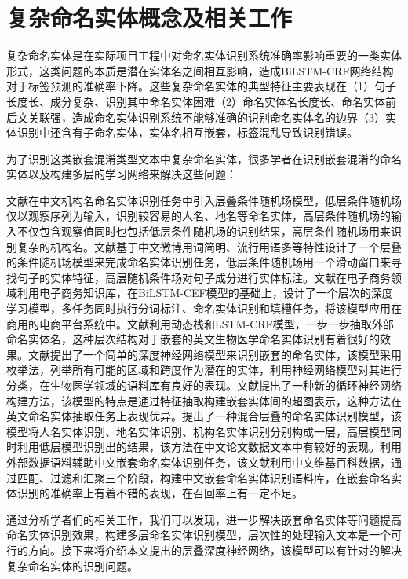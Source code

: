 \documentclass[winfonts,master,oneside,nobackinfo]{njuthesis}
\begin{document}
\section{复杂命名实体概念及相关工作}

复杂命名实体是在实际项目工程中对命名实体识别系统准确率影响重要的一类实体形式，这类问题的本质是潜在实体名之间相互影响，造成BiLSTM-CRF网络结构对于标签预测的准确率下降。这些复杂命名实体的典型特征主要表现在（1）句子长度长、成分复杂、识别其中命名实体困难（2）命名实体名长度长、命名实体前后文关联强，造成命名实体识别系统不能够准确的识别命名实体名的边界（3）实体识别中还含有子命名实体，实体名相互嵌套，标签混乱导致识别错误。

为了识别这类嵌套混淆类型文本中复杂命名实体，很多学者在识别嵌套混淆的命名实体以及构建多层的学习网络来解决这些问题：

文献\cite{junsheng}在中文机构名命名实体识别任务中引入层叠条件随机场模型，低层条件随机场仅以观察序列为输入，识别较容易的人名、地名等命名实体，高层条件随机场的输入不仅包含观察值同时也包括低层条件随机场的识别结果，高层条件随机场用来识别复杂的机构名。文献\cite{Yixue}基于中文微博用词简明、流行用语多等特性设计了一个层叠的条件随机场模型来完成命名实体识别任务，低层条件随机场用一个滑动窗口来寻找句子的实体特征，高层随机条件场对句子成分进行实体标注。文献\cite{taobao}在电子商务领域利用电子商务知识库，在BiLSTM-CEF模型的基础上，设计了一个层次的深度学习模型，多任务同时执行分词标注、命名实体识别和填槽任务，将该模型应用在商用的电商平台系统中。文献\cite{Meizhi}利用动态栈和LSTM-CRF模型，一步一步抽取外部命名实体名，这种层次结构对于嵌套的英文生物医学命名实体识别有着很好的效果。文献\cite{Mohammad}提出了一个简单的深度神经网络模型来识别嵌套的命名实体，该模型采用枚举法，列举所有可能的区域和跨度作为潜在的实体，利用神经网络模型对其进行分类，在生物医学领域的语料库有良好的表现。文献\cite{Arzoo}提出了一种新的循环神经网络构建方法，该模型的特点是通过特征抽取构建嵌套实体间的超图表示，这种方法在英文命名实体抽取任务上表现优异。\cite{Jia}提出了一种混合层叠的命名实体识别模型，该模型将人名实体识别、地名实体识别、机构名实体识别分别构成一层，高层模型同时利用低层模型识别出的结果，该方法在中文论文数据文本中有较好的表现。\cite{yanqun}利用外部数据语料辅助中文嵌套命名实体识别任务，该文献利用中文维基百科数据，通过匹配、过滤和汇聚三个阶段，构建中文嵌套命名实体识别语料库，在嵌套命名实体识别的准确率上有着不错的表现，在召回率上有一定不足。

通过分析学者们的相关工作，我们可以发现，进一步解决嵌套命名实体等问题提高命名实体识别效果，构建多层命名实体识别模型，层次性的处理输入文本是一个可行的方向。接下来将介绍本文提出的层叠深度神经网络，该模型可以有针对的解决复杂命名实体的识别问题。
\end{document}

